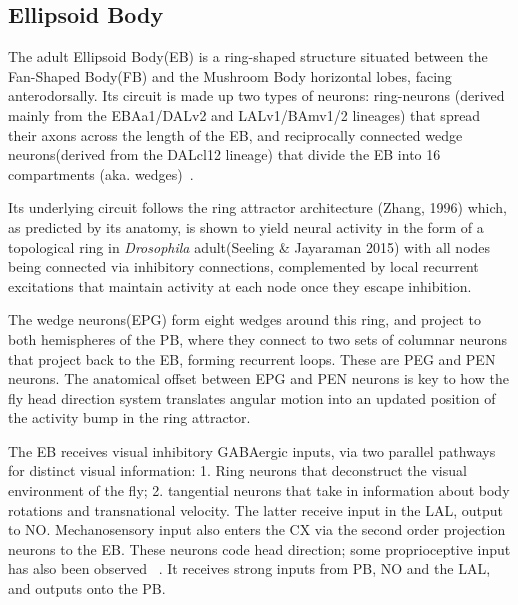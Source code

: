 



\subsection*{Ellipsoid Body}
The adult Ellipsoid Body(EB) is a ring-shaped structure situated between the Fan-Shaped Body(FB) and the Mushroom Body horizontal lobes, facing anterodorsally. Its circuit is made up two types of neurons: ring-neurons (derived mainly from the EBAa1/DALv2 and LALv1/BAmv1/2 lineages) that spread their axons across the length of the EB, and reciprocally connected wedge neurons(derived from the DALcl12 lineage) that divide the EB into 16 compartments (aka. wedges)~\citep{omoto2018neuronal}. 

Its underlying circuit follows the ring attractor architecture (Zhang, 1996) which, as predicted by its anatomy, is shown to yield neural activity in the form of a topological ring in \textit{Drosophila} adult(Seeling \& Jayaraman 2015) with all nodes being connected via inhibitory connections, complemented by local recurrent excitations that maintain activity at each node once they escape inhibition.%

The wedge neurons(EPG) form eight wedges around this ring, and project to both hemispheres of the PB, where they connect to two sets of columnar neurons that project back to the EB, forming recurrent loops. These are PEG and PEN neurons. The anatomical offset between EPG and PEN neurons is key to how the fly head direction system translates angular motion into an updated position of the activity bump in the ring attractor. 


The EB receives visual inhibitory GABAergic inputs, via two parallel pathways for distinct visual information:
1. Ring neurons that deconstruct the visual environment of the fly; 2. tangential neurons that take in information about body rotations and transnational velocity. The latter receive input in the LAL, output to NO.
Mechanosensory input also enters the CX via the second order projection neurons to the EB. These neurons code head direction; some proprioceptive input has also been observed 
~\citep{hulse2021connectome}. It receives strong inputs from PB, NO and the LAL, and outputs onto the PB.  


